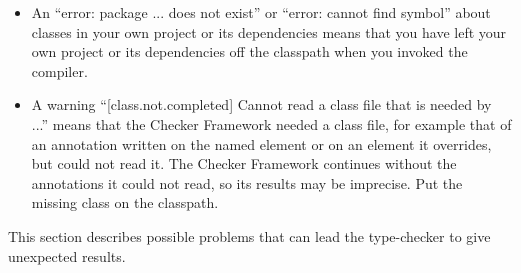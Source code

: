 \begin{itemize}
\item
An ``error: package ... does not exist'' or ``error: cannot find symbol''
about classes in your own project or its dependencies means that you have
left your own project or its dependencies off the classpath when you
invoked the compiler.

\item
A warning ``[class.not.completed] Cannot read a class file that is needed
by ...'' means that the Checker Framework needed a class file, for example
that of an annotation written on the named element or on an element it
overrides, but could not read it.  The Checker Framework continues without
the annotations it could not read, so its results may be imprecise.  Put
the missing class on the classpath.

\end{itemize}



This section describes possible problems that can lead the type-checker to
give unexpected results.


